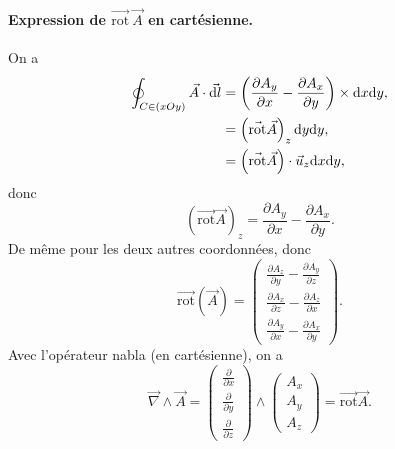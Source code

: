         \paragraph{Expression de $\vec{\mathrm{rot}}~\vec{A}$ en cartésienne.}

            On a 
            \begin{align}
                \oint_{C\in(xOy)}\vec{A}\cdot\vec{\mathrm{d} l}
                &=\left(\frac{\partial A_y}{\partial x}-\frac{\partial A_x}{\partial y}\right)\times\mathrm{d} x\mathrm{d} y,\\
                &=
                \left(\vec{\mathrm{rot}}\vec{A}\right)_{z}\mathrm{d} y\mathrm{d} y,\\
                &=
                \left(\vec{\mathrm{rot}}\vec{A}\right)\cdot\vec{u}_z\mathrm{d} x\mathrm{d} y,
            \end{align}
            donc 
            \begin{equation}
                \boxed{
                    \left(\vec{\mathrm{rot}}\vec{A}\right)_{z}=\frac{\partial A_y}{\partial x}-\frac{\partial A_x}{\partial y}.
                }
            \end{equation}
            De même pour les deux autres coordonnées, donc 
            \begin{equation}
                \boxed{
                    \vec{\mathrm{rot}}(\vec{A})=
                    \begin{pmatrix}
                        \frac{\partial A_z}{\partial y}-\frac{\partial A_y}{\partial z}\\
                        \frac{\partial A_x}{\partial z}-\frac{\partial A_z}{\partial x}\\
                        \frac{\partial A_y}{\partial x}-\frac{\partial A_x}{\partial y}
                    \end{pmatrix}.
                }
            \end{equation}
            Avec l'opérateur nabla (en cartésienne), on a 
            \begin{equation}
                \boxed{
                    \vec{\nabla}\wedge\vec{A}=\begin{pmatrix}
                        \frac{\partial}{\partial x}\\
                        \frac{\partial}{\partial y}\\
                        \frac{\partial}{\partial z}
                    \end{pmatrix}\wedge
                    \begin{pmatrix}
                        A_x\\A_y\\A_z
                    \end{pmatrix}=\vec{\mathrm{rot}}\vec{A}
                }.
            \end{equation}

